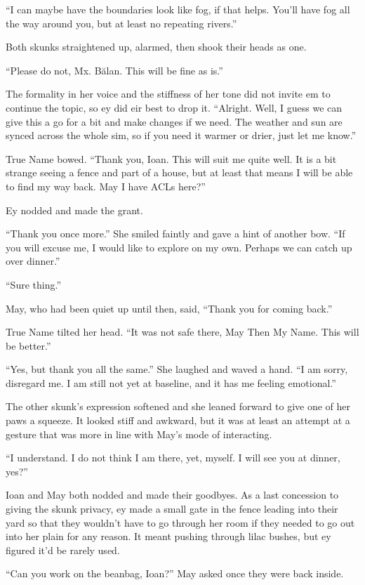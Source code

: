 ``I can maybe have the boundaries look like fog, if that helps. You'll have fog all the way around you, but at least no repeating rivers.''

Both skunks straightened up, alarmed, then shook their heads as one.

``Please do not, Mx. Bălan. This will be fine as is.''

The formality in her voice and the stiffness of her tone did not invite em to continue the topic, so ey did eir best to drop it. ``Alright. Well, I guess we can give this a go for a bit and make changes if we need. The weather and sun are synced across the whole sim, so if you need it warmer or drier, just let me know.''

True Name bowed. ``Thank you, Ioan. This will suit me quite well. It is a bit strange seeing a fence and part of a house, but at least that means I will be able to find my way back. May I have ACLs here?''

Ey nodded and made the grant.

``Thank you once more.'' She smiled faintly and gave a hint of another bow. ``If you will excuse me, I would like to explore on my own. Perhaps we can catch up over dinner.''

``Sure thing.''

May, who had been quiet up until then, said, ``Thank you for coming back.''

True Name tilted her head. ``It was not safe there, May Then My Name. This will be better.''

``Yes, but thank you all the same.'' She laughed and waved a hand. ``I am sorry, disregard me. I am still not yet at baseline, and it has me feeling emotional.''

The other skunk's expression softened and she leaned forward to give one of her paws a squeeze. It looked stiff and awkward, but it was at least an attempt at a gesture that was more in line with May's mode of interacting.

``I understand. I do not think I am there, yet, myself. I will see you at dinner, yes?''

Ioan and May both nodded and made their goodbyes. As a last concession to giving the skunk privacy, ey made a small gate in the fence leading into their yard so that they wouldn't have to go through her room if they needed to go out into her plain for any reason. It meant pushing through lilac bushes, but ey figured it'd be rarely used.

``Can you work on the beanbag, Ioan?'' May asked once they were back inside.

